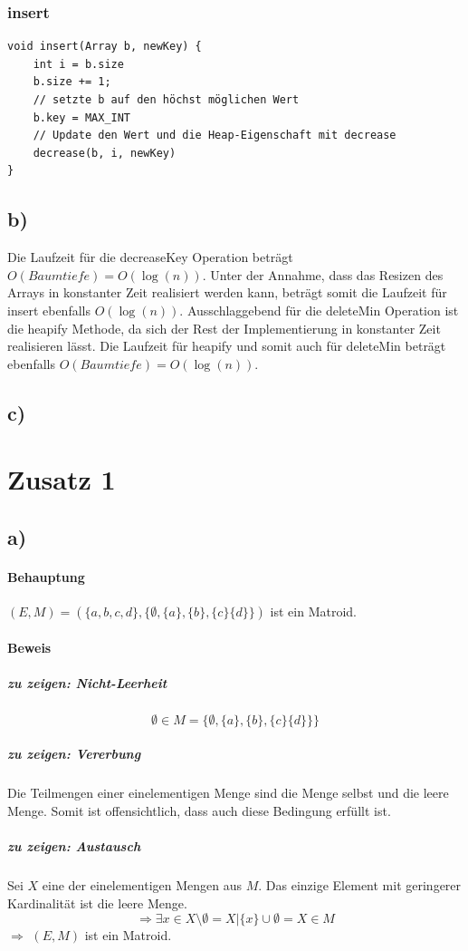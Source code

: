 \documentclass[a4paper,11pt,twoside]{scrartcl}
\begin{document}
\subsubsection*{insert}
\begin{lstlisting}[style=c,basicstyle=\small\ttfamily]
void insert(Array b, newKey) {
	int i = b.size
	b.size += 1;
	// setzte b auf den höchst möglichen Wert
	b.key = MAX_INT 
	// Update den Wert und die Heap-Eigenschaft mit decrease
	decrease(b, i, newKey)
}
\end{lstlisting}


\subsection*{b)}
Die Laufzeit für die decreaseKey Operation beträgt $O(Baumtiefe) = O(\log(n))$. Unter der Annahme, dass das Resizen des Arrays in konstanter Zeit realisiert werden kann, beträgt somit die Laufzeit für insert ebenfalls $O(\log(n))$. Ausschlaggebend für die deleteMin Operation ist die heapify Methode, da sich der Rest der Implementierung in konstanter Zeit realisieren lässt. Die Laufzeit für heapify und somit auch für deleteMin beträgt ebenfalls $O(Baumtiefe) = O(\log(n))$.

\subsection*{c)}


\section*{Zusatz 1}
\subsection*{a)}
\paragraph{Behauptung}
$(E,M) = (\{ a,b,c,d \}, \{ \emptyset,\{ a \},\{ b \},\{ c \}\{ d \}\}  )$ ist ein Matroid.
\paragraph{Beweis}
\subparagraph{zu zeigen: Nicht-Leerheit}
\[ \emptyset\in M=\{  \emptyset,\{ a \},\{ b \},\{ c \}\{ d \}\} \} \]
\subparagraph{zu zeigen: Vererbung}
Die Teilmengen einer einelementigen Menge sind die Menge selbst und die leere Menge. Somit ist offensichtlich, dass auch diese Bedingung erfüllt ist.
\subparagraph{zu zeigen: Austausch}
Sei $X$ eine der einelementigen Mengen aus $M$. Das einzige Element mit geringerer Kardinalität ist die leere Menge.
\[\Rightarrow \exists x\in X\setminus\emptyset=X | \{ x \}\cup\emptyset=X\in M \]
$\Rightarrow$ $(E,M)$ ist ein Matroid.
\end{document}
